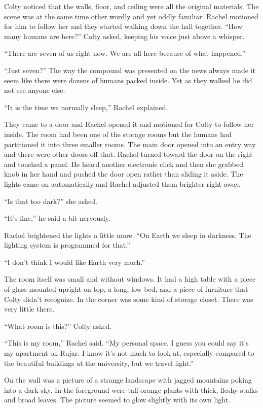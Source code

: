 Colty noticed that the walls, floor, and ceiling were all the original materials. The scene was
at the same time other wordly and yet oddly familiar. Rachel motioned for him to follow her and
they started walking down the hall together. ``How many humans are here?'' Colty asked, keeping
his voice just above a whisper.

``There are seven of us right now. We are all here because of what happened.''

``Just seven?'' The way the compound was presented on the news always made it seem like there
were dozens of humans packed inside. Yet as they walked he did not see anyone else.

``It is the time we normally sleep,'' Rachel explained.

They came to a door and Rachel opened it and motioned for Colty to follow her inside. The room
had been one of the storage rooms but the humans had partitioned it into three smaller rooms.
The main door opened into an entry way and there were other doors off that. Rachel turned toward
the door on the right and touched a panel. He heard another electronic click and then she
grabbed knob in her hand and pushed the door open rather than sliding it aside. The lights came
on automatically and Rachel adjusted them brighter right away.

``Is that too dark?'' she asked.

``It's fine,'' he said a bit nervously.

Rachel brightened the lights a little more. ``On Earth we sleep in darkness. The lighting system
is programmed for that.''

``I don't think I would like Earth very much.''

The room itself was small and without windows. It had a high table with a piece of glass mounted
upright on top, a long, low bed, and a piece of furniture that Colty didn't recognize. In the
corner was some kind of storage closet. There was very little there.

``What room is this?'' Colty asked.

``This is my room,'' Rachel said. ``My personal space. I guess you could say it's my apartment
on Rujar. I know it's not much to look at, especially compared to the beautiful buildings at
the university, but we travel light.''

On the wall was a picture of a strange landscape with jagged mountains poking into a dark sky.
In the foreground were tall orange plants with thick, fleshy stalks and broad leaves. The
picture seemed to glow slightly with its own light.

